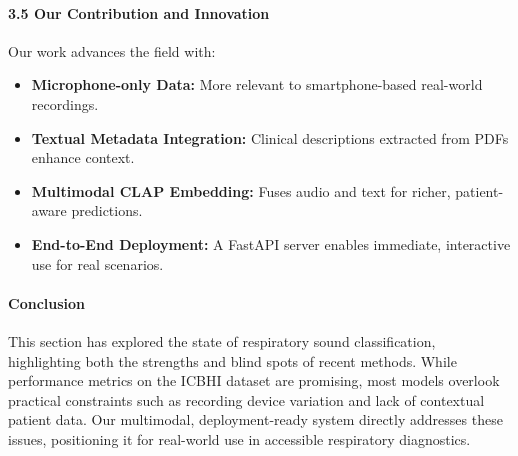 \paragraph{3.5 Our Contribution and Innovation\\}
Our work advances the field with:
\begin{itemize}
    \item \textbf{Microphone-only Data:} More relevant to smartphone-based real-world recordings.
    \item \textbf{Textual Metadata Integration:} Clinical descriptions extracted from PDFs enhance context.
    \item \textbf{Multimodal CLAP Embedding:} Fuses audio and text for richer, patient-aware predictions.
    \item \textbf{End-to-End Deployment:} A FastAPI server enables immediate, interactive use for real scenarios.
\end{itemize}

\paragraph{Conclusion\\}
This section has explored the state of respiratory sound classification, highlighting both the strengths and blind spots of recent methods. While performance metrics on the ICBHI dataset are promising, most models overlook practical constraints such as recording device variation and lack of contextual patient data. Our multimodal, deployment-ready system directly addresses these issues, positioning it for real-world use in accessible respiratory diagnostics.
